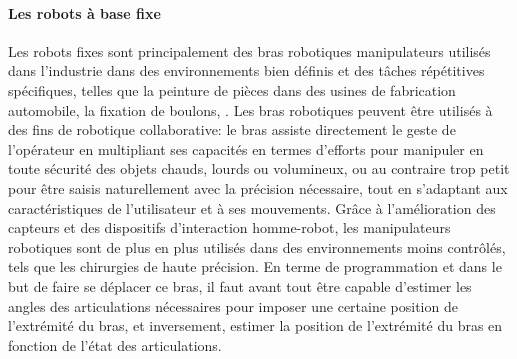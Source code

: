             \paragraph{Les robots à base fixe}
                Les robots fixes sont principalement des bras robotiques manipulateurs utilisés dans l'industrie dans des environnements bien définis et des tâches répétitives spécifiques, telles que la peinture de pièces dans des usines de fabrication automobile, la fixation de boulons, \etc. Les bras robotiques peuvent être utilisés à des fins de robotique collaborative: le bras assiste directement le geste de l'opérateur en multipliant ses capacités en termes d'efforts pour manipuler en toute sécurité des objets chauds, lourds ou volumineux, ou au contraire trop petit pour être saisis naturellement avec la précision nécessaire, tout en s'adaptant aux caractéristiques de l'utilisateur et à ses mouvements. Grâce à l'amélioration des capteurs et des dispositifs d'interaction homme-robot, les manipulateurs robotiques sont de plus en plus utilisés dans des environnements moins contrôlés, tels que les chirurgies de haute précision.
                En terme de programmation et dans le but de faire se déplacer ce bras, il faut avant tout être capable d'estimer les angles des articulations nécessaires pour imposer une certaine position de l'extrémité du bras, et inversement, estimer la position de l'extrémité du bras en fonction de l'état des articulations.
